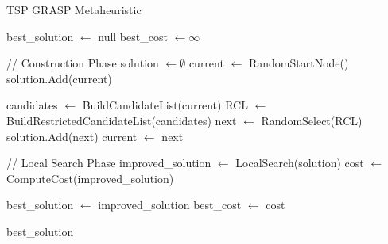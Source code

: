 \documentclass{article}
\begin{document}
\newpage
\begin{algorithm}[!ht]
\caption{TSP GRASP Metaheuristic}
\begin{algorithmic}[1]
\State best\_solution $\gets$ null
\State best\_cost $\gets \infty$

	\State // Construction Phase
	\State solution $\gets \emptyset$
	\State current $\gets$ RandomStartNode()
	\State solution.Add(current)
	
		\State candidates $\gets$ BuildCandidateList(current)
		\State RCL $\gets$ BuildRestrictedCandidateList(candidates)
		\State next $\gets$ RandomSelect(RCL)
		\State solution.Add(next)
		\State current $\gets$ next
	\EndWhile
	
	\State // Local Search Phase
	\State improved\_solution $\gets$ LocalSearch(solution)
	\State cost $\gets$ ComputeCost(improved\_solution)
	
		\State best\_solution $\gets$ improved\_solution
		\State best\_cost $\gets$ cost
	\EndIf
\EndFor

\State \Return best\_solution
\EndProcedure
\end{algorithmic}
\end{algorithm}
\end{document}
